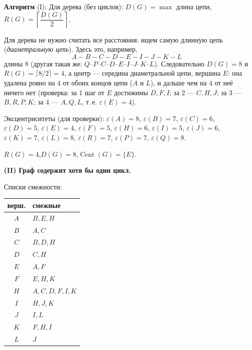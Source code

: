 \textbf{Алгоритм} (I): Для дерева (без циклов):
$D(G) = \max$ длина цепи,\;
$R(G) = \left\lceil \dfrac{D(G)}{2} \right\rceil$.


Для дерева не нужно считать все расстояния: ищем самую длинную цепь
(\emph{диаметральную цепь}). Здесь это, например,
\[
  A - B - C - D - E - I - J - K - L
\]
длины $8$ (другая такая же: $Q$--$P$--$C$--$D$--$E$--$I$--$J$--$K$--$L$).
Следовательно $D(G) = 8$ и $R(G) = \lceil 8/2 \rceil = 4$, а центр ---
середина диаметральной цепи, вершина $E$: она удалена ровно на $4$ от
обоих концов цепи ($A$ и $L$), и дальше чем на $4$ от неё ничего нет
(проверка: за 1 шаг от $E$ достижимы $D, F, I$; за 2 --- $C, H, J$;
за 3 --- $B, R, P, K$; за 4 --- $A, Q, L$, т.\,е. $\varepsilon(E) = 4$).

\medskip
Эксцентриситеты (для проверки):
$\varepsilon(A) = 8$,\;
$\varepsilon(B) = 7$,\;
$\varepsilon(C) = 6$,\;
$\varepsilon(D) = 5$,\;
$\varepsilon(E) = 4$,\;
$\varepsilon(F) = 5$,\;
$\varepsilon(H) = 6$,\;
$\varepsilon(I) = 5$,\;
$\varepsilon(J) = 6$,\;
$\varepsilon(K) = 7$,\;
$\varepsilon(L) = 8$,\;
$\varepsilon(R) = 7$,\;
$\varepsilon(P) = 7$,\;
$\varepsilon(Q) = 8$.

$R(G) = 4$,\quad $D(G) = 8$,\quad $\operatorname{Cent}(G) = \{E\}$.

\bigskip
\textbf{(II) Граф содержит хотя бы один цикл.}


Списки смежности:

\begin{tabular}{c|l}
  верш. & смежные \\ \hline
  $A$ & $B, E, H$ \\
  $B$ & $A, C$ \\
  $C$ & $B, D, H$ \\
  $D$ & $C, H$ \\
  $E$ & $A, F$ \\
  $F$ & $E, H, K$ \\
  $H$ & $A, C, D, F, I, K$ \\
  $I$ & $H, J, K$ \\
  $J$ & $I, L$ \\
  $K$ & $F, H, I$ \\
  $L$ & $J$ \\
\end{tabular}

